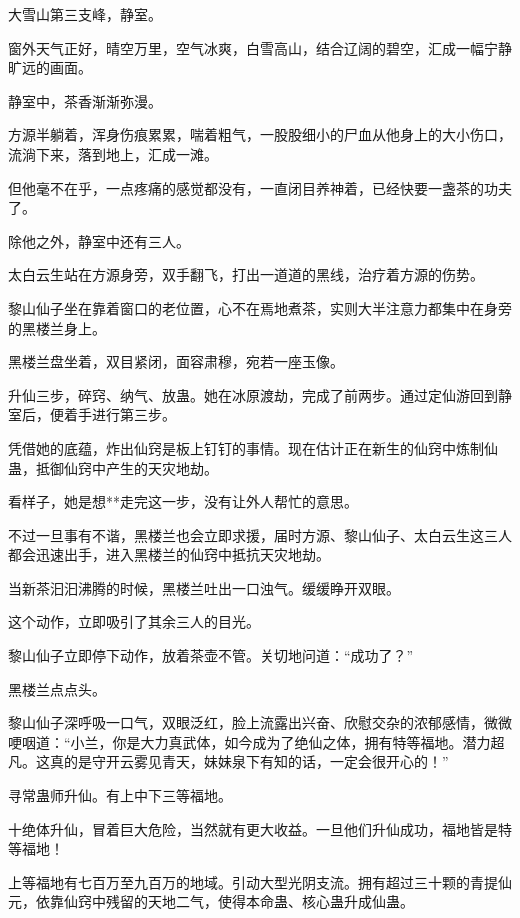 
\begin{this_body}

大雪山第三支峰，静室。

窗外天气正好，晴空万里，空气冰爽，白雪高山，结合辽阔的碧空，汇成一幅宁静旷远的画面。

静室中，茶香渐渐弥漫。

方源半躺着，浑身伤痕累累，喘着粗气，一股股细小的尸血从他身上的大小伤口，流淌下来，落到地上，汇成一滩。

但他毫不在乎，一点疼痛的感觉都没有，一直闭目养神着，已经快要一盏茶的功夫了。

除他之外，静室中还有三人。

太白云生站在方源身旁，双手翻飞，打出一道道的黑线，治疗着方源的伤势。

黎山仙子坐在靠着窗口的老位置，心不在焉地煮茶，实则大半注意力都集中在身旁的黑楼兰身上。

黑楼兰盘坐着，双目紧闭，面容肃穆，宛若一座玉像。

升仙三步，碎窍、纳气、放蛊。她在冰原渡劫，完成了前两步。通过定仙游回到静室后，便着手进行第三步。

凭借她的底蕴，炸出仙窍是板上钉钉的事情。现在估计正在新生的仙窍中炼制仙蛊，抵御仙窍中产生的天灾地劫。

看样子，她是想**走完这一步，没有让外人帮忙的意思。

不过一旦事有不谐，黑楼兰也会立即求援，届时方源、黎山仙子、太白云生这三人都会迅速出手，进入黑楼兰的仙窍中抵抗天灾地劫。

当新茶汩汩沸腾的时候，黑楼兰吐出一口浊气。缓缓睁开双眼。

这个动作，立即吸引了其余三人的目光。

黎山仙子立即停下动作，放着茶壶不管。关切地问道：“成功了？”

黑楼兰点点头。

黎山仙子深呼吸一口气，双眼泛红，脸上流露出兴奋、欣慰交杂的浓郁感情，微微哽咽道：“小兰，你是大力真武体，如今成为了绝仙之体，拥有特等福地。潜力超凡。这真的是守开云雾见青天，妹妹泉下有知的话，一定会很开心的！”

寻常蛊师升仙。有上中下三等福地。

十绝体升仙，冒着巨大危险，当然就有更大收益。一旦他们升仙成功，福地皆是特等福地！

上等福地有七百万至九百万的地域。引动大型光阴支流。拥有超过三十颗的青提仙元，依靠仙窍中残留的天地二气，使得本命蛊、核心蛊升成仙蛊。


\end{this_body}
